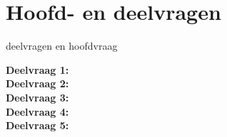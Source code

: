 \section{Hoofd- en deelvragen}
deelvragen en hoofdvraag

\textbf{Deelvraag 1:} \SubquestionOne   \\
\textbf{Deelvraag 2:} \SubquestionTwo   \\
\textbf{Deelvraag 3:} \SubquestionThree \\
\textbf{Deelvraag 4:} \SubquestionFour  \\
\textbf{Deelvraag 5:} \SubquestionFive  \\
